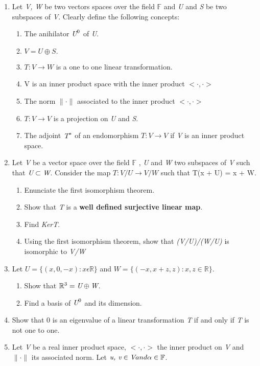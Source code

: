 \documentclass[a4paper]{book}
\begin{document}
\begin{enumerate}
\item Let \emph{V, W} be two vectors spaces over the field $\mathbb{F}$ and \emph{U} and \emph{S} be two subspaces of \emph{V}. Clearly define the following concepts:
	\begin{enumerate}
	\item The anihilator $\emph{U}^0$ of \emph{U}.
	\item $V = U \oplus S.$
	\item $T : V \rightarrow W$ is a one to one linear transformation.
	\item V is an inner product space with the inner product $<\cdot,\cdot>$
	\item The norm $\lVert \cdot \rVert$ associated to the inner product $<\cdot, \cdot>$
	\item $T : V \rightarrow V$ is a projection on \emph{U} and \emph{S}.
	\item The adjoint $\emph{T}^*$ of an endomorphism $T : V \rightarrow V$ if \emph{V} is an inner product space. 
	\end{enumerate}
\item Let \emph{V} be a vector space over the field $\mathbb{F}$ , \emph{U} and \emph{W} two subspaces of \emph{V} such that $\emph{U} \subset \emph{W}$. Consider the map $T : V/U \rightarrow V/W$ such that T(x + U) = x + W.
	\begin{enumerate}
	\item Enunciate the first isomorphism theorem.
	\item Show that \emph{T} is a \textbf{well defined surjective linear map}.
	\item Find \emph{KerT}.
	\item Using the first isomorphism theorem, show that \emph{(V/U)/(W/U)} is isomorphic to \emph{V/W}
	\end{enumerate}
\item Let $U = \{(x, 0, -x) : x \epsilon \mathbb{R} \}$ and $W = \{(-x, x +z, z) : x, z \in \mathbb{R}\}$.
	\begin{enumerate}
	\item Show that $\mathbb{R}^3 = \emph{U} \oplus \emph{W}$.
	\item Find a basis of $\emph{U}^0$ and its dimension.
\end{enumerate}
	\item Show that 0 is an eigenvalue of a linear transformation \emph{T} if and only if \emph{T} is not one to one.
	\item Let \emph{V} be a real inner product space, $<\cdot,\cdot>$ the inner product on \emph{V} and $\lVert \cdot \rVert$ its associated norm. Let $\emph{u, v} \in \emph{V} and \alpha \in \mathbb{F}$.

\end{enumerate}
\end{document}
